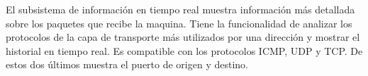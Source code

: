 El subsistema de información en tiempo real muestra información más detallada sobre los paquetes que recibe la maquina. Tiene la funcionalidad de analizar los protocolos de la capa de transporte más utilizados por una dirección y mostrar el historial en tiempo real. Es compatible con los protocolos ICMP, UDP y TCP. De estos dos últimos muestra el puerto de origen y destino.